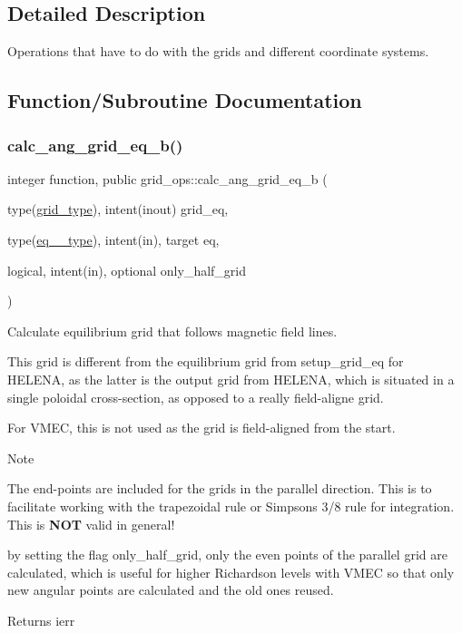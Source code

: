 \subsection{Detailed Description}
Operations that have to do with the grids and different coordinate systems. 

\subsection{Function/\+Subroutine Documentation}
\mbox{\label{namespacegrid__ops_a06107dbdfd1dd62e372cc29ab0255bad}} 
\subsubsection{\texorpdfstring{calc\+\_\+ang\+\_\+grid\+\_\+eq\+\_\+b()}{calc\_ang\_grid\_eq\_b()}}
{\footnotesize\ttfamily integer function, public grid\+\_\+ops\+::calc\+\_\+ang\+\_\+grid\+\_\+eq\+\_\+b (\begin{DoxyParamCaption}\item[{type(\hyperlink{structgrid__vars_1_1grid__type}{grid\+\_\+type}), intent(inout)}]{grid\+\_\+eq,  }\item[{type(\hyperlink{structeq__vars_1_1eq__1__type}{eq\+\_\+1\+\_\+type}), intent(in), target}]{eq,  }\item[{logical, intent(in), optional}]{only\+\_\+half\+\_\+grid }\end{DoxyParamCaption})}



Calculate equilibrium grid that follows magnetic field lines. 

This grid is different from the equilibrium grid from setup\+\_\+grid\+\_\+eq for H\+E\+L\+E\+NA, as the latter is the output grid from H\+E\+L\+E\+NA, which is situated in a single poloidal cross-\/section, as opposed to a really field-\/aligne grid.

For V\+M\+EC, this is not used as the grid is field-\/aligned from the start.

\begin{DoxyNote}{Note}

\begin{DoxyEnumerate}
\item The end-\/points are included for the grids in the parallel direction. This is to facilitate working with the trapezoidal rule or Simpson\textquotesingle{}s 3/8 rule for integration. This is {\bfseries N\+OT} valid in general!
\item by setting the flag {\ttfamily only\+\_\+half\+\_\+grid}, only the even points of the parallel grid are calculated, which is useful for higher Richardson levels with V\+M\+EC so that only new angular points are calculated and the old ones reused.
\end{DoxyEnumerate}
\end{DoxyNote}
\begin{DoxyReturn}{Returns}
ierr
\end{DoxyReturn}

